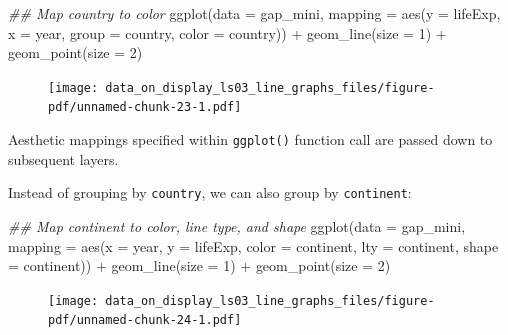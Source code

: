 \documentclass[
  letterpaper,
  DIV=11,
  numbers=noendperiod]{scrreprt}
\newenvironment{Shaded}{\begin{snugshade}}{\end{snugshade}}
\newcommand{\AttributeTok}[1]{\textcolor[rgb]{0.40,0.45,0.13}{#1}}
\newcommand{\DecValTok}[1]{\textcolor[rgb]{0.68,0.00,0.00}{#1}}
\newcommand{\DocumentationTok}[1]{\textcolor[rgb]{0.37,0.37,0.37}{\textit{#1}}}
\newcommand{\FunctionTok}[1]{\textcolor[rgb]{0.28,0.35,0.67}{#1}}
\newcommand{\NormalTok}[1]{\textcolor[rgb]{0.00,0.23,0.31}{#1}}
\newcommand{\SpecialCharTok}[1]{\textcolor[rgb]{0.37,0.37,0.37}{#1}}
\begin{document}
\begin{Shaded}
\begin{Highlighting}[]
\DocumentationTok{\#\# Map country to color}
\FunctionTok{ggplot}\NormalTok{(}\AttributeTok{data =}\NormalTok{ gap\_mini, }
       \AttributeTok{mapping =} \FunctionTok{aes}\NormalTok{(}\AttributeTok{y =}\NormalTok{ lifeExp, }\AttributeTok{x =}\NormalTok{ year, }
                     \AttributeTok{group =}\NormalTok{ country, }
                     \AttributeTok{color =}\NormalTok{ country)) }\SpecialCharTok{+}
  \FunctionTok{geom\_line}\NormalTok{(}\AttributeTok{size =} \DecValTok{1}\NormalTok{) }\SpecialCharTok{+}
  \FunctionTok{geom\_point}\NormalTok{(}\AttributeTok{size =} \DecValTok{2}\NormalTok{)}
\end{Highlighting}
\end{Shaded}

\begin{figure}[H]

{\centering \texttt{[image: data\_on\_display\_ls03\_line\_graphs\_files/figure-pdf/unnamed-chunk-23-1.pdf]}

}

\end{figure}

Aesthetic mappings specified within \texttt{ggplot()} function call are
passed down to subsequent layers.

Instead of grouping by \texttt{country}, we can also group by
\texttt{continent}:

\begin{Shaded}
\begin{Highlighting}[]
\DocumentationTok{\#\# Map continent to color, line type, and shape}
\FunctionTok{ggplot}\NormalTok{(}\AttributeTok{data =}\NormalTok{ gap\_mini, }
       \AttributeTok{mapping =} \FunctionTok{aes}\NormalTok{(}\AttributeTok{x =}\NormalTok{ year,}
                     \AttributeTok{y =}\NormalTok{ lifeExp,}
                     \AttributeTok{color =}\NormalTok{ continent,}
                     \AttributeTok{lty =}\NormalTok{ continent,}
                     \AttributeTok{shape =}\NormalTok{ continent)) }\SpecialCharTok{+}
  \FunctionTok{geom\_line}\NormalTok{(}\AttributeTok{size =} \DecValTok{1}\NormalTok{) }\SpecialCharTok{+}
  \FunctionTok{geom\_point}\NormalTok{(}\AttributeTok{size =} \DecValTok{2}\NormalTok{)}
\end{Highlighting}
\end{Shaded}

\begin{figure}[H]

{\centering \texttt{[image: data\_on\_display\_ls03\_line\_graphs\_files/figure-pdf/unnamed-chunk-24-1.pdf]}

}

\end{figure}
\end{document}
